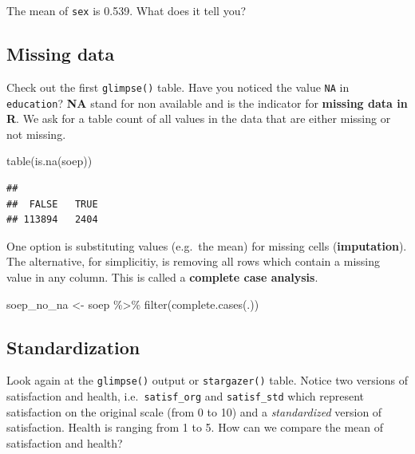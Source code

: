 \documentclass[
]{book}
\newenvironment{Shaded}{\begin{snugshade}}{\end{snugshade}}
\newcommand{\FunctionTok}[1]{\textcolor[rgb]{0.00,0.00,0.00}{#1}}
\newcommand{\NormalTok}[1]{#1}
\newcommand{\OtherTok}[1]{\textcolor[rgb]{0.56,0.35,0.01}{#1}}
\newcommand{\SpecialCharTok}[1]{\textcolor[rgb]{0.00,0.00,0.00}{#1}}
\begin{document}
The mean of \texttt{sex} is 0.539. What does it tell you?

\hypertarget{missing-data}{%
\subsection{Missing data}\label{missing-data}}

Check out the first \texttt{glimpse()} table. Have you noticed the value \texttt{NA} in \texttt{education}? \textbf{NA} stand for non available and is the indicator for \textbf{missing data in R}. We ask for a table count of all values in the data that are either missing or not missing.

\begin{Shaded}
\begin{Highlighting}[]
\FunctionTok{table}\NormalTok{(}\FunctionTok{is.na}\NormalTok{(soep))}
\end{Highlighting}
\end{Shaded}

\begin{verbatim}
## 
##  FALSE   TRUE 
## 113894   2404
\end{verbatim}

One option is substituting values (e.g.~the mean) for missing cells (\textbf{imputation}). The alternative, for simplicitiy, is removing all rows which contain a missing value in any column. This is called a \textbf{complete case analysis}.

\begin{Shaded}
\begin{Highlighting}[]
\NormalTok{soep\_no\_na }\OtherTok{\textless{}{-}}\NormalTok{ soep }\SpecialCharTok{\%\textgreater{}\%} \FunctionTok{filter}\NormalTok{(}\FunctionTok{complete.cases}\NormalTok{(.))}
\end{Highlighting}
\end{Shaded}

\hypertarget{standardization}{%
\subsection{Standardization}\label{standardization}}

Look again at the \texttt{glimpse()} output or \texttt{stargazer()} table. Notice two versions of satisfaction and health, i.e.~\texttt{satisf\_org} and \texttt{satisf\_std} which represent satisfaction on the original scale (from 0 to 10) and a \emph{standardized} version of satisfaction. Health is ranging from 1 to 5. How can we compare the mean of satisfaction and health?
\end{document}
